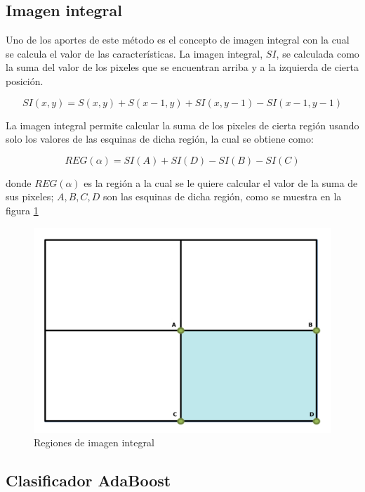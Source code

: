 \subsection{Imagen integral}\label{subsec:IntegralImage} 

Uno de los aportes de este método es el concepto de imagen integral con la cual se calcula el valor de las características. La imagen integral, $SI$, se calculada como la suma del valor de los pixeles que se encuentran arriba y a la izquierda de cierta posición.    

$$SI(x,y)=S(x,y) + S(x-1,y) + SI(x,y-1)-SI(x-1,y-1)$$ 

La imagen integral permite calcular la suma de los pixeles de cierta región usando solo los valores de las esquinas de dicha región, la cual se obtiene como:   

$$REG(\alpha)=SI(A)+SI(D)-SI(B)-SI(C)$$

donde $REG(\alpha)$ es la región a la cual se le quiere calcular el valor de la suma de sus pixeles; $A,B,C,D$ son las esquinas de dicha región, como se muestra en la figura \ref{fig:figImageIntegral}

\begin{figure}[!h]
\begin{center}
\includegraphics[scale=.3]{./Figures/IntegralImage.png}
\end{center}
\caption{Regiones de imagen integral}
\label{fig:figImageIntegral}
\end{figure} 

\subsection{Clasificador AdaBoost}\label{subsec:AdaboostClasifier}  

